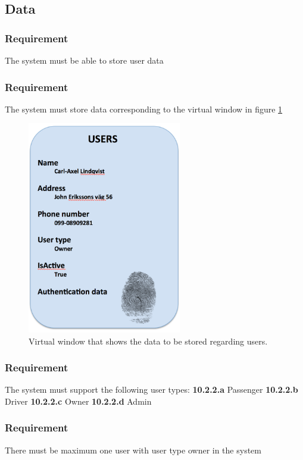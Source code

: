 \documentclass{article}
\begin{document}
{  \subsection{Data}
      \subsubsection{Requirement}
\hfill \break 
\- \- \-The system must be able to store user data
      \subsubsection{Requirement}
\hfill \break 
\- \- \-The system must store data corresponding to the virtual window in figure \ref{vw1}
\begin{figure}[htb]   
 \centering
 \includegraphics[width=0.6\textwidth]
    {VirtualWindow1.png}
  \caption{Virtual window that shows the data to be stored regarding users.}
  \label{vw1}
\end{figure}
\bigskip
      \subsubsection{Requirement}
\hfill \break 
\- \- \-The system must support the following user types:
\hfill \break 
\indent
\textbf{10.2.2.a} Passenger
\hfill \break 
\indent
\textbf{10.2.2.b} Driver
\hfill \break 
\indent
\textbf{10.2.2.c} Owner
\hfill \break 
\indent
\textbf{10.2.2.d} Admin
      \subsubsection{Requirement}
\hfill \break 
\- \- \-There must be maximum one user with user type owner in the system
}
\end{document}
